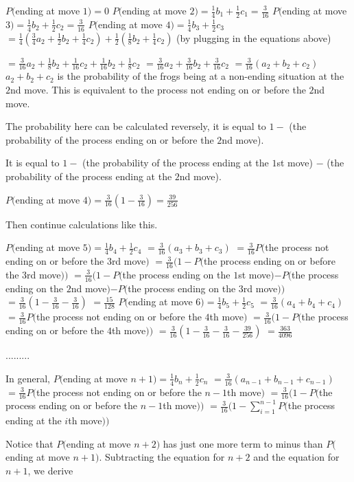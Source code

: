 \begin{enumerate}
 
$P($ending at move $1)$$=0$
$P($ending at move $2)$$=\frac{1}{4}b_1+\frac{1}{2}c_1=\frac{3}{16}$
$P($ending at move $3)$$=\frac{1}{4}b_2+\frac{1}{2}c_2=\frac{3}{16}$
$P($ending at move $4)$$=\frac{1}{4}b_3+\frac{1}{2}c_3$
$=\frac{1}{4}(\frac{3}{4}a_2+\frac{1}{2}b_2+\frac{1}{4}c_2)+\frac{1}{2}(\frac{1}{8}b_2+\frac{1}{4}c_2)$ (by plugging in the equations above)

 $=\frac{3}{16}a_2+\frac{1}{8}b_2+\frac{1}{16}c_2+\frac{1}{16}b_2+\frac{1}{8}c_2$
$=\frac{3}{16}a_2+\frac{3}{16}b_2+\frac{3}{16}c_2$
$=\frac{3}{16}(a_2+b_2+c_2)$
$a_2+b_2+c_2$ is the probability of the frogs being at a non-ending situation at the $2$nd move. This is equivalent to the process not ending on or before the $2$nd move.

 The probability here can be calculated reversely, it is equal to $1-$ (the probability of the process ending on or before the $2$nd move).

 It is equal to $1-$ (the probability of the process ending at the $1$st move) $-$ (the probability of the process ending at the $2$nd move).

 $P($ending at move $4)$$=\frac{3}{16}(1-\frac{3}{16})=\frac{39}{256}$

 
Then continue calculations like this.

 
$P($ending at move $5)$$=\frac{1}{4}b_4+\frac{1}{2}c_4$
$=\frac{3}{16}(a_3+b_3+c_3)$
$=\frac{3}{16}$$P($the process not ending on or before the $3$rd move$)$
$=\frac{3}{16}$$(1-P($the process ending on or before the $3$rd move$))$
$=\frac{3}{16}$$(1-P($the process ending on the $1$st move$)$$-P($the process ending on the $2$nd move$)$$-P($the process ending on the $3$rd move$))$
$=\frac{3}{16}(1-\frac{3}{16}-\frac{3}{16})$
$=\frac{15}{128}$
$P($ending at move $6)$$=\frac{1}{4}b_5+\frac{1}{2}c_5$
$=\frac{3}{16}(a_4+b_4+c_4)$
$=\frac{3}{16}$$P($the process not ending on or before the $4$th move$)$
$=\frac{3}{16}$$(1-P($the process ending on or before the $4$th move$))$
$=\frac{3}{16}(1-\frac{3}{16}-\frac{3}{16}-\frac{39}{256})$
$=\frac{363}{4096}$

 
.........

 
In general, $P($ending at move ${n+1})$$=\frac{1}{4}b_n+\frac{1}{2}c_n$
$=\frac{3}{16}(a_{n-1}+b_{n-1}+c_{n-1})$
$=\frac{3}{16}$$P($the process not ending on or before the $n-1$th move$)$
$=\frac{3}{16}$$(1-P($the process ending on or before the $n-1$th move$))$
$=\frac{3}{16}$$(1-\sum_{i=1}^{n-1}P($the process ending at the $i$th move$))$

 Notice that $P($ending at move ${n+2})$ has just one more term to minus than $P($ending at move ${n+1})$. Subtracting the equation for $n+2$ and the equation for $n+1$, we derive


\end{enumerate}
